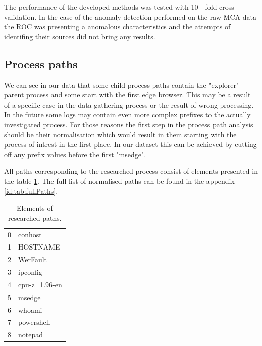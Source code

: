 \documentclass[a4paper,twoside,12pt]{book}
\begin{document}
The performance of the developed methods was tested with 10 - fold cross validation. In the case of
the anomaly detection performed on the raw MCA data the ROC was presenting a anomalous characteristics 
and the attempts of identifing their sources did not bring any results.

\subsection{Process paths}



We can see in our data that some child process paths contain the "explorer" parent process and some start with the first 
edge browser. This may be a result of a specific case in the data gathering process or the result of wrong 
processing. In the future some logs may contain even more complex prefixes to the actually investigated
process. For those reasons the first step in the process path analysis should be their normalisation which
would result in them starting with the process of intrest in the first place. In our dataset this can 
be achieved by cutting off any prefix values before the first "msedge".  

All paths corresponding to the researched process consist of elements presented in the table 
\ref{id:tab:pathElems}. The full list of normalised paths can be found in the appendix \ref{id:tab:fullPaths}.

\begin{table}
\centering
\caption{Elements of researched paths.}
\label{id:tab:pathElems}
\begin{tabular}{ll}
	\toprule
	0 &        conhost \\
	1 &       HOSTNAME \\
	2 &       WerFault \\
	3 &       ipconfig \\
	4 &  cpu-z\_1.96-en \\
	5 &         msedge \\
	6 &         whoami \\
	7 &     powershell \\
	8 &        notepad \\
	\bottomrule
\end{tabular}
\end{table}		
	
\end{document}
